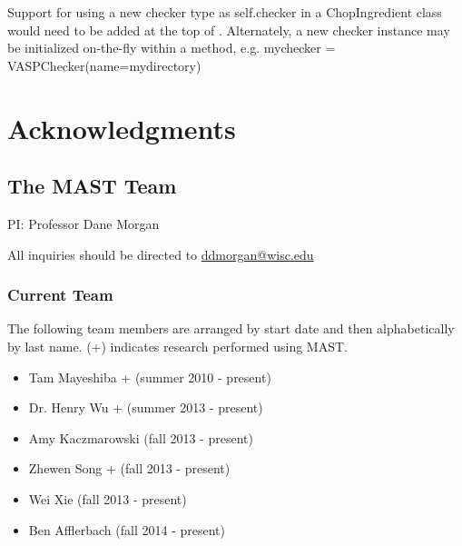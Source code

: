 \documentclass[letterpaper,10pt,english]{sphinxmanual}
\begin{document}
Support for using a new checker type as self.checker in a ChopIngredient class would need to be added at the top of .
Alternately, a new checker instance may be initialized on-the-fly within a method, e.g. mychecker = VASPChecker(name=mydirectory)


\chapter{Acknowledgments}
\label{10_0_acknowledgments::doc}\label{10_0_acknowledgments:acknowledgments}

\section{The MAST Team}
\label{10_0_acknowledgments:the-mast-team}
PI: Professor Dane Morgan

All inquiries should be directed to \href{mailto:ddmorgan@wisc.edu}{ddmorgan@wisc.edu}


\subsection{Current Team}
\label{10_0_acknowledgments:current-team}
The following team members are arranged by start date and then alphabetically by last name. (+) indicates research performed using MAST.
\begin{itemize}
\item {} 
Tam Mayeshiba + (summer 2010 - present)

\item {} 
Dr. Henry Wu + (summer 2013 - present)

\item {} 
Amy Kaczmarowski (fall 2013 - present)

\item {} 
Zhewen Song + (fall 2013 - present)

\item {} 
Wei Xie (fall 2013 - present)

\item {} 
Ben Afflerbach (fall 2014 - present)

\end{itemize}
\end{document}
